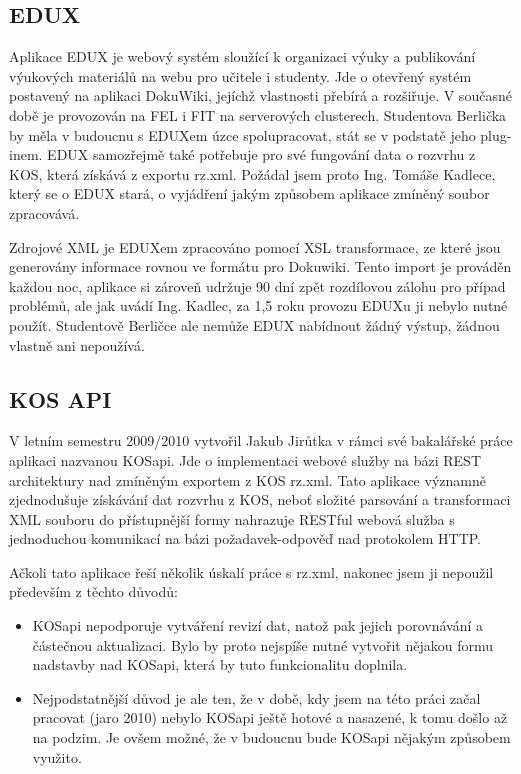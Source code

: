 \documentclass[11pt,twoside,a4paper]{book}
\begin{document}
\subsection{EDUX}
Aplikace EDUX je webový systém sloužící k organizaci výuky a publikování výukových materiálů na webu pro učitele i studenty. Jde o otevřený systém postavený na aplikaci DokuWiki, jejíchž vlastnosti přebírá a rozšiřuje. V současné době je provozován na FEL i FIT na serverových clusterech. Studentova Berlička by měla v budoucnu s EDUXem úzce spolupracovat, stát se v podstatě jeho plug-inem. EDUX samozřejmě také potřebuje pro své fungování data o rozvrhu z KOS, která získává z exportu rz.xml. Požádal jsem proto Ing. Tomáše Kadlece, který se o EDUX stará, o vyjádření jakým způsobem aplikace zmíněný soubor zpracovává.

Zdrojové XML je EDUXem zpracováno pomocí XSL transformace, ze které jsou generovány informace rovnou ve formátu pro Dokuwiki. Tento import je prováděn každou noc, aplikace si zároveň udržuje 90 dní zpět rozdílovou zálohu pro případ problémů, ale jak uvádí Ing. Kadlec, za 1,5 roku provozu EDUXu ji nebylo nutné použít. Studentově Berličce ale nemůže EDUX nabídnout žádný výstup, žádnou  vlastně ani nepoužívá.

\subsection{KOS API}
V letním semestru 2009/2010 vytvořil Jakub Jirůtka v rámci své bakalářské práce\cite{jirutka} aplikaci nazvanou KOSapi. Jde o implementaci webové služby na bázi REST architektury nad zmíněným exportem z KOS rz.xml. Tato aplikace významně zjednodušuje získávání dat rozvrhu z KOS, neboť složité parsování a transformaci XML souboru do přístupnější formy nahrazuje RESTful webová služba s jednoduchou komunikací na bázi požadavek-odpověď nad protokolem HTTP.

Ačkoli tato aplikace řeší několik úskalí práce s rz.xml, nakonec jsem ji nepoužil především z těchto důvodů:
\begin{itemize}
\item KOSapi nepodporuje vytváření revizí dat, natož pak jejich porovnávání a částečnou aktualizaci. Bylo by proto nejspíše nutné vytvořit nějakou formu nadstavby nad KOSapi, která by tuto funkcionalitu doplnila.
\item Nejpodstatnější důvod je ale ten, že v době, kdy jsem na této práci začal pracovat (jaro 2010) nebylo KOSapi ještě hotové a nasazené, k tomu došlo až na podzim. Je ovšem možné, že v budoucnu bude KOSapi nějakým způsobem využito.
\end{itemize}
\end{document}
